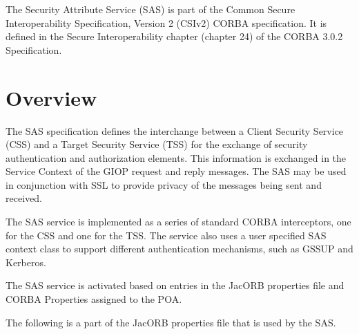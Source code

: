 
The Security Attribute Service (SAS) is part of the Common Secure
Interoperability Specification, Version 2 (CSIv2) CORBA specification.
It is defined in the Secure Interoperability chapter (chapter 24) of the
CORBA 3.0.2 Specification.

\section{Overview}

The SAS specification defines the interchange between a Client Security
Service (CSS) and a Target Security Service (TSS)
for the exchange of security authentication and authorization
elements. This information is exchanged in the Service Context of the GIOP
request and reply messages. The SAS may be used in conjunction with SSL to
provide privacy of the messages being sent and received.

The SAS service is implemented as a series of standard CORBA interceptors,
one for the CSS and one for the TSS. The service also uses a user specified
SAS context class to support different authentication mechanisms, such as
GSSUP and Kerberos.

The SAS service is activated based on entries in the JacORB properties file
and CORBA Properties assigned to the POA.

The following is a part of the JacORB properties file that is used by
the SAS.

